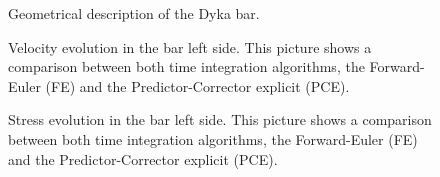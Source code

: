 \documentclass{article}
\begin{document}

\begin{figure}\sidecaption
  \centering
  \resizebox{0.85\hsize}{!}{
    }
  \caption{Geometrical description of the Dyka \cite{Dyka1995} bar.}
  \label{fig:Dyka_Bar}
\end{figure}

\begin{figure}\sidecaption
  \centering
  \caption{Velocity evolution in the bar left side. This picture
    shows a comparison between both time integration algorithms,
    the Forward-Euler (FE) and the Predictor-Corrector explicit (PCE).}
  \label{fig:Velocity-Dyka-PCE-FE}
\end{figure}

\begin{figure}\sidecaption
  \centering
  \caption{Stress evolution in the bar left side. This picture
    shows a comparison between both time integration algorithms,
    the Forward-Euler (FE) and the Predictor-Corrector explicit (PCE).}
  \label{fig:Stress-Dyka-PCE-FE}
\end{figure}
\end{document}

